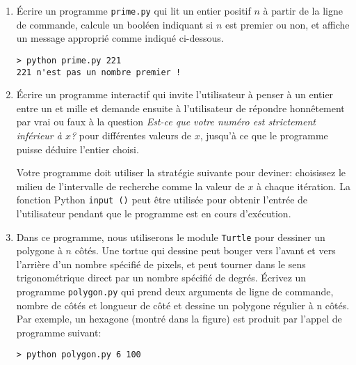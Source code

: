 \documentclass[a4paper]{article}
\begin{document}
\begin{enumerate}
\begin{verbatim}
   *
  ***
 *****
*******
\end{verbatim}

\item Écrire un programme {\tt prime.py} qui lit un entier positif $n$ à partir de la ligne de commande, calcule un booléen
 indiquant si $n$ est premier ou non, et affiche un message approprié comme indiqué ci-dessous.
\begin{verbatim}
> python prime.py 221
221 n'est pas un nombre premier !
\end{verbatim}

\item Écrire un programme interactif qui invite l'utilisateur à penser à un entier entre un et mille
et demande ensuite à l'utilisateur de répondre honnêtement par vrai ou faux à la question {\it Est-ce que votre numéro est strictement inférieur  à $x$? } pour différentes valeurs de $x$, jusqu'à ce que le programme puisse déduire l'entier choisi.

Votre programme doit utiliser la stratégie suivante pour deviner: choisissez le milieu de l'intervalle de recherche comme
la valeur de $x$ à chaque itération. La fonction Python {\tt input ()} peut être utilisée pour obtenir l'entrée de l'utilisateur pendant que le programme est en cours d'exécution.

\item Dans ce programme, nous utiliserons le module {\tt Turtle} pour dessiner un polygone à $n$ côtés. Une tortue qui dessine peut bouger vers l'avant et vers l'arrière d'un nombre spécifié de pixels, et peut tourner dans le sens trigonométrique direct par un nombre spécifié de degrés. Écrivez un programme {\tt polygon.py} qui prend deux arguments de ligne de commande, nombre de côtés et longueur de côté et dessine un polygone régulier à n côtés. Par exemple, un hexagone (montré dans la figure) est produit par l'appel de programme suivant:

\begin{verbatim}
> python polygon.py 6 100
\end{verbatim}

\begin{center}
\end{center}
\end{enumerate}
\end{document}
